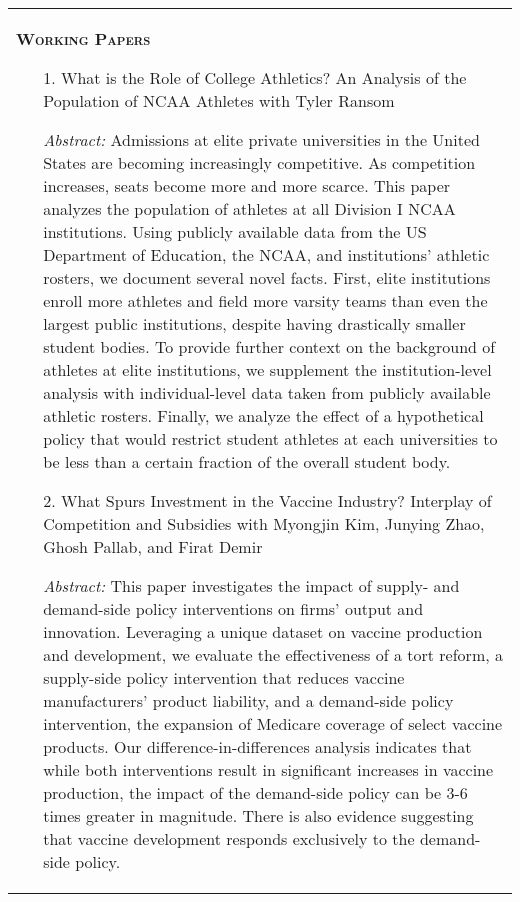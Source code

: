 \documentclass[10pt,letterpaper]{article}
\begin{document}
\begin{tabular}{p{7.5in}}

{\textsc{\textbf{Working Papers}}}

\begin{enumerate}

\item[1.]  What is the Role of College Athletics? An Analysis of the Population of NCAA Athletes with Tyler Ransom

\textit{Abstract:} Admissions at elite private universities in the United States are becoming increasingly competitive. As competition increases, seats become more and more scarce. This paper analyzes the population of athletes at all Division I NCAA institutions. Using publicly available data from the US Department of Education, the NCAA, and institutions' athletic rosters, we document several novel facts. First, elite institutions enroll more athletes and field more varsity teams than even the largest public institutions, despite having drastically smaller student bodies. To provide further context on the background of athletes at elite institutions, we supplement the institution-level analysis with individual-level data taken from publicly available athletic rosters. Finally, we analyze the effect of a hypothetical policy that would restrict student athletes at each universities to be less than a certain fraction of the overall student body.

\item[2.] What Spurs Investment in the Vaccine Industry? Interplay of Competition and Subsidies with Myongjin Kim,  Junying Zhao,  Ghosh Pallab, and Firat Demir 

\textit{Abstract: } This paper investigates the impact of supply- and demand-side policy interventions on firms' output and innovation. Leveraging a unique dataset on vaccine production and development, we evaluate the effectiveness of a tort reform, a supply-side policy intervention that reduces vaccine manufacturers' product liability, and a demand-side policy intervention, the expansion of Medicare coverage of select vaccine products. Our difference-in-differences analysis indicates that while both interventions result in significant increases in vaccine production, the impact of the demand-side policy can be 3-6 times greater in magnitude. There is also evidence suggesting that vaccine development responds exclusively to the demand-side policy. 

\end{enumerate}



\end{tabular}
\end{document}
